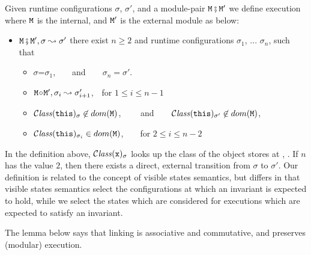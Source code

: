 \begin{definition}
\label{def:execution:internal:external}
\label{def:module_pair_execution} 
Given runtime configurations $\sigma$,  $\sigma'$,  and a module-pair ${\mbox{\tt{\ensuremath{{\mbox{\tt{M}}}}}}} \fatsemi {\mbox{\tt{\ensuremath{{\mbox{\tt{M}}}}}}}'$ we define
execution where ${\mbox{\tt{\ensuremath{{\mbox{\tt{M}}}}}}}$ is the internal, and ${\mbox{\tt{\ensuremath{{\mbox{\tt{M}}}}}}}'$ is the external module as below:
 
\begin{itemize}
\item
${\mbox{\tt{\ensuremath{{\mbox{\tt{M}}}}}}} \fatsemi {\mbox{\tt{\ensuremath{{\mbox{\tt{M}}}}}}}', \sigma \leadsto \sigma'$ \IFF
there exist  $n\geq 2$ and runtime configurations $\sigma_1$,  ...
$\sigma_n$, such that
\begin{itemize}
\item
$\sigma$=$\sigma_1$,\ \  \ \ and\ \ \ \ $\sigma_n=\sigma'$.
\item
${\mbox{\tt{\ensuremath{{\mbox{\tt{M}}}}}}} \!\circ\! {\mbox{\tt{\ensuremath{{\mbox{\tt{M}}}}}}}', \sigma_i \leadsto \sigma_{i+1}'$,\  \  for $1\leq i \leq n\!-\!1$
\item
${\mathcal C}{\mathit{lass}}({\mbox{\tt{this}}})_{\sigma}\not\in dom({{\mbox{\tt{\ensuremath{{\mbox{\tt{M}}}}}}}})$,  \ \  \ \ and\ \ \ \
${\mathcal C}{\mathit{lass}}({\mbox{\tt{this}}})_{\sigma'} \not\in dom({{\mbox{\tt{\ensuremath{{\mbox{\tt{M}}}}}}}})$,
\item
 ${\mathcal C}{\mathit{lass}}({\mbox{\tt{this}}})_{\sigma_i} \in dom({{\mbox{\tt{\ensuremath{{\mbox{\tt{M}}}}}}}})$,\ \ \ \ for $2\leq i \leq n\!-\!2$
\end{itemize}
\end{itemize}

\end{definition}

In the definition above,  ${\mathcal C}{\mathit{lass}}({\mbox{\tt{x}}})_{\sigma} $ looks up the class of the object stores at \x, .
If  $n$  has the value $2$, %
then  there exists a direct, external transition from $\sigma$ to $\sigma'$.  Our definition is related to the concept of visible states semantics\cite{MuellerPoetzsch-HeffterLeavens06}, but differs in that visible states semantics select the configurations at which an invariant is expected to hold, while we select the states which are considered for executions which are expected to satisfy an invariant. 

The lemma below says  that linking is associative and commutative, and preserves (modular) execution.

